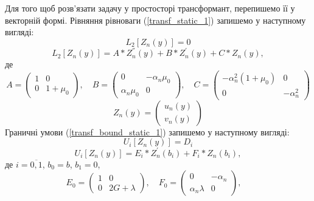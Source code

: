 Для того щоб розв'язати задачу у простосторі трансформант, перепишемо її у векторній формі.
Рівняння рівноваги (\ref{transf_static_1}) запишемо у наступному вигляді:
\begin{equation}\label{transf_mat_static_1}
    L_2\left[ Z_n(y) \right] = 0
\end{equation}
\begin{equation}
    L_2\left[ Z_n(y) \right] = A * Z_n^{''}(y) + B * Z_n^{'}(y) + C * Z_n(y),
\end{equation}
де
\begin{equation*}
    A = \begin{pmatrix}
        1 & 0 \\
        0 & 1 + \mu_0
    \end{pmatrix}, \quad
    B = \begin{pmatrix}
        0 & -\alpha_n \mu_0 \\
        \alpha_n \mu_0 & 0
    \end{pmatrix}, \quad
    C = \begin{pmatrix}
        -\alpha_n^2(1 + \mu_0) & 0 \\
        0 & -\alpha_n^2
    \end{pmatrix}
\end{equation*}
\begin{equation*}
    Z_n(y) = \begin{pmatrix}
        u_n(y) \\
        v_n(y)
    \end{pmatrix}
\end{equation*}
Граничні умови (\ref{transf_bound_static_1}) запишемо у наступному вигляді:
\begin{equation}\label{transf_bound_mat_static_1}
    U_i\left[ Z_n(y) \right] = D_i
\end{equation}
\begin{equation}
    U_i\left[ Z_n(y) \right] = E_i * Z_n^{'}(b_i) + F_i * Z_n(b_i),
\end{equation}
де $i = \overline{0, 1}$, $b_0 = b$, $b_1 = 0$,
\begin{equation*}
    E_0 = \begin{pmatrix}
        1 & 0 \\
        0 & 2G + \lambda
    \end{pmatrix}, \quad
    F_0 = \begin{pmatrix}
        0 & -\alpha_n \\
        \alpha_n \lambda & 0
    \end{pmatrix}, \quad
\end{equation*}
